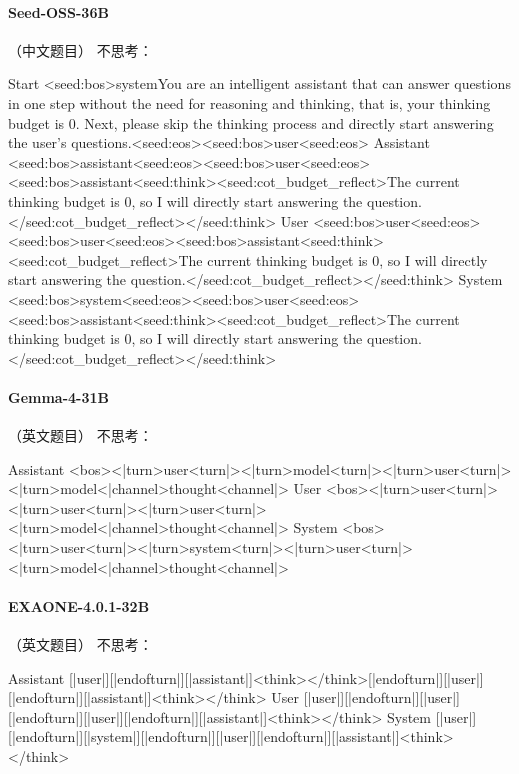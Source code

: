 \paragraph{Seed-OSS-36B} （中文题目）
\noindent 不思考：
\begin{Rendering}
Start      <seed:bos>system\NL{}You are an intelligent assistant that can answer questions in one step without the need for reasoning and thinking, that is, your thinking budget is 0. Next, please skip the thinking process and directly start answering the user's questions.\NL{}<seed:eos><seed:bos>user\NL{}<seed:eos>
Assistant  <seed:bos>assistant\NL{}<seed:eos><seed:bos>user\NL{}<seed:eos><seed:bos>assistant\NL{}<seed:think>\NL{}<seed:cot_budget_reflect>The current thinking budget is 0, so I will directly start answering the question.</seed:cot_budget_reflect>\NL{}</seed:think>
User       <seed:bos>user\NL{}<seed:eos><seed:bos>user\NL{}<seed:eos><seed:bos>assistant\NL{}<seed:think>\NL{}<seed:cot_budget_reflect>The current thinking budget is 0, so I will directly start answering the question.</seed:cot_budget_reflect>\NL{}</seed:think>
System     <seed:bos>system\NL{}<seed:eos><seed:bos>user\NL{}<seed:eos><seed:bos>assistant\NL{}<seed:think>\NL{}<seed:cot_budget_reflect>The current thinking budget is 0, so I will directly start answering the question.</seed:cot_budget_reflect>\NL{}</seed:think>
\end{Rendering}
\paragraph{Gemma-4-31B} （英文题目）
\noindent 不思考：
\begin{Rendering}
Assistant  <bos><|turn>user\NL{}<turn|>\NL{}<|turn>model\NL{}<turn|>\NL{}<|turn>user\NL{}<turn|>\NL{}<|turn>model\NL{}<|channel>thought\NL{}<channel|>
User       <bos><|turn>user\NL{}<turn|>\NL{}<|turn>user\NL{}<turn|>\NL{}<|turn>user\NL{}<turn|>\NL{}<|turn>model\NL{}<|channel>thought\NL{}<channel|>
System     <bos><|turn>user\NL{}<turn|>\NL{}<|turn>system\NL{}<turn|>\NL{}<|turn>user\NL{}<turn|>\NL{}<|turn>model\NL{}<|channel>thought\NL{}<channel|>
\end{Rendering}
\paragraph{EXAONE-4.0.1-32B} （英文题目）
\noindent 不思考：
\begin{Rendering}
Assistant  [|user|]\NL{}[|endofturn|]\NL{}[|assistant|]\NL{}<think>\NL{}\NL{}</think>\NL{}\NL{}[|endofturn|]\NL{}[|user|]\NL{}[|endofturn|]\NL{}[|assistant|]\NL{}<think>\NL{}\NL{}</think>\NL{}\NL{}
User       [|user|]\NL{}[|endofturn|]\NL{}[|user|]\NL{}[|endofturn|]\NL{}[|user|]\NL{}[|endofturn|]\NL{}[|assistant|]\NL{}<think>\NL{}\NL{}</think>\NL{}\NL{}
System     [|user|]\NL{}[|endofturn|]\NL{}[|system|]\NL{}[|endofturn|]\NL{}[|user|]\NL{}[|endofturn|]\NL{}[|assistant|]\NL{}<think>\NL{}\NL{}</think>\NL{}\NL{}
\end{Rendering}
